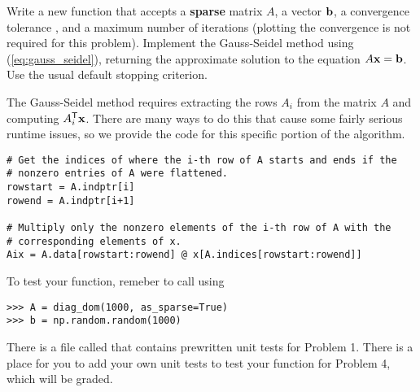 \begin{problem} %
Write a new function that accepts a \textbf{sparse} matrix $A$, a vector $\mathbf{b}$, a convergence tolerance , and a maximum number of iterations  (plotting the convergence is not required for this problem).
Implement the Gauss-Seidel method using (\ref{eq:gauss_seidel}), returning the approximate solution to the equation $A\mathbf{x} = \mathbf{b}$.
Use the usual default stopping criterion.

The Gauss-Seidel method requires extracting the rows $A_i$ from the matrix $A$ and computing $A_i^{\mathsf T}\mathbf{x}$.
There are many ways to do this that cause some fairly serious runtime issues, so we provide the code for this specific portion of the algorithm.

\begin{lstlisting}
# Get the indices of where the i-th row of A starts and ends if the
# nonzero entries of A were flattened.
rowstart = A.indptr[i]
rowend = A.indptr[i+1]

# Multiply only the nonzero elements of the i-th row of A with the
# corresponding elements of x.
Aix = A.data[rowstart:rowend] @ x[A.indices[rowstart:rowend]]
\end{lstlisting}

\begin{comment} Now diag_dom returns the matrix as an ndarray by default, 
    but it actually constructs it as a sparse matrix using the code given. 
    Only when we need it as a CSR matrix, we just pass as_csr=True inside the function call. 
    This way, the audience doesn't need to modify anything except for the way in which they 
    create the matrix to be used for testing problem 4:
\end{comment}

To test your function, remeber to call  using 

\begin{lstlisting}
>>> A = diag_dom(1000, as_sparse=True)
>>> b = np.random.random(1000)
\end{lstlisting}
\end{problem}

\begin{unittest}
There is a file called  that contains prewritten unit tests for Problem 1.
There is a place for you to add your own unit tests to test your function for Problem 4, which will be graded.
\end{unittest}

